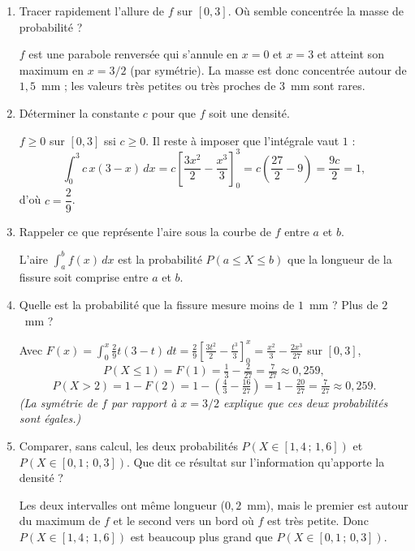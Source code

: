 \begin{enumerate}
  \item Tracer rapidement l'allure de $f$ sur $[0,3]$.
  Où semble concentrée la masse de probabilité ?
  \begin{solution}
    $f$ est une parabole renversée qui s'annule en $x=0$ et $x=3$
    et atteint son maximum en $x=3/2$ (par symétrie).
    La masse est donc concentrée autour de $1{,}5$~mm ;
    les valeurs très petites ou très proches de $3$~mm sont rares.
  \end{solution}

  \item Déterminer la constante $c$ pour que $f$ soit une densité.
  \begin{solution}
    $f\ge 0$ sur $[0,3]$ ssi $c\ge 0$. Il reste à imposer
    que l'intégrale vaut $1$ :
    \[
      \int_0^3 c\,x(3-x)\,dx
      =c\left[\frac{3x^2}{2}-\frac{x^3}{3}\right]_0^3
      =c\left(\frac{27}{2}-9\right)=\frac{9c}{2}=1,
    \]
    d'où $c=\dfrac{2}{9}$.
  \end{solution}

  \item Rappeler ce que représente l'aire sous
  la courbe de $f$ entre $a$ et $b$.
  \begin{solution}
    L'aire $\int_a^b f(x)\,dx$ est la probabilité
    $P(a\le X\le b)$ que la longueur de la fissure soit comprise
    entre $a$ et $b$.
  \end{solution}

  \item Quelle est la probabilité que la fissure mesure moins
  de $1$~mm ? Plus de $2$~mm ?
  \begin{solution}
    Avec $F(x)=\int_0^x\tfrac{2}{9}t(3-t)\,dt
    =\tfrac{2}{9}\!\left[\tfrac{3t^2}{2}-\tfrac{t^3}{3}\right]_0^x
    =\tfrac{x^2}{3}-\tfrac{2x^3}{27}$ sur $[0,3]$,
    \[
      P(X\le 1)=F(1)=\tfrac{1}{3}-\tfrac{2}{27}=\tfrac{7}{27}\approx 0{,}259,
    \]
    \[
      P(X>2)=1-F(2)=1-\left(\tfrac{4}{3}-\tfrac{16}{27}\right)
      =1-\tfrac{20}{27}=\tfrac{7}{27}\approx 0{,}259.
    \]
    \textit{(La symétrie de $f$ par rapport à $x=3/2$ explique
    que ces deux probabilités sont égales.)}
  \end{solution}

  \item Comparer, sans calcul, les deux probabilités
  $P(X\in[1{,}4\,;\,1{,}6])$ et $P(X\in[0{,}1\,;\,0{,}3])$.
  Que dit ce résultat sur l'information qu'apporte la densité ?
  \begin{solution}
    Les deux intervalles ont même longueur ($0{,}2$~mm), mais le premier
    est autour du maximum de $f$ et le second vers un bord où $f$ est
    très petite. Donc $P(X\in[1{,}4\,;\,1{,}6])$ est beaucoup plus
    grand que $P(X\in[0{,}1\,;\,0{,}3])$.


\end{solution}
\end{enumerate}
